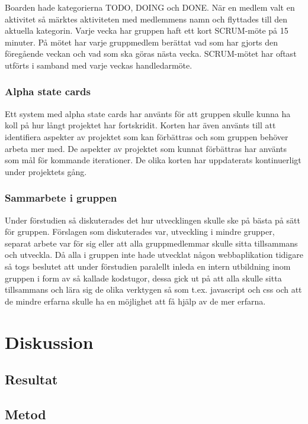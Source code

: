 \documentclass{article}
\begin{document}
Boarden hade kategorierna TODO, DOING och DONE. När en medlem valt en aktivitet så märktes aktiviteten med medlemmens namn och flyttades till den aktuella kategorin. Varje vecka har gruppen haft ett kort SCRUM-möte på 15 minuter. På mötet har varje gruppmedlem berättat vad som har gjorts den föregående veckan och vad som ska göras nästa vecka. SCRUM-mötet har oftast utförts i samband med varje veckas handledarmöte.

\subsubsection{Alpha state cards}
Ett system med alpha state cards har använts för att gruppen skulle kunna ha koll på hur långt projektet har fortskridit. Korten har även använts till att identifiera aspekter av projektet som kan förbättras och som gruppen behöver arbeta mer med. De aspekter av projektet som kunnat förbättras har använts som mål för kommande iterationer. De olika korten har uppdaterats kontinuerligt under projektets gång.

\subsubsection{Sammarbete i gruppen}
Under förstudien så diskuterades det hur utvecklingen skulle ske på bästa på sätt för gruppen. Förslagen som diskuterades var, utveckling i mindre grupper, separat arbete var för sig eller att alla gruppmedlemmar skulle sitta tillsammans och utveckla. Då alla i gruppen inte hade utvecklat någon webbaplikation tidigare så togs beslutet att under förstudien paralellt inleda en intern utbildning inom gruppen i form av så kallade kodstugor, dessa gick ut på att alla skulle sitta tillsammans och lära sig de olika verktygen så som t.ex. javascript och css och att de mindre erfarna skulle ha en möjlighet att få hjälp av de mer erfarna.


\clearpage

\clearpage

\section{Diskussion}

\subsection{Resultat}

\subsection{Metod}
\end{document}
